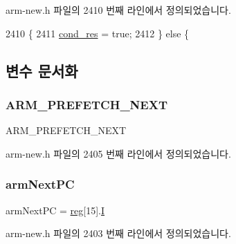 arm-\/new.\+h 파일의 2410 번째 라인에서 정의되었습니다.


\begin{DoxyCode}
2410                    \{
2411     \mbox{\hyperlink{arm-new_8h_ae931ce7d834148867ceeb444446afb40}{cond\_res}} = \textcolor{keyword}{true};
2412   \} \textcolor{keywordflow}{else} \{
\end{DoxyCode}


\subsection{변수 문서화}
\mbox{\label{arm-new_8h_a20dd0c8e065b8d3fe145119c5180f98a}} 
\subsubsection{\texorpdfstring{A\+R\+M\+\_\+\+P\+R\+E\+F\+E\+T\+C\+H\+\_\+\+N\+E\+XT}{ARM\_PREFETCH\_NEXT}}
{\footnotesize\ttfamily A\+R\+M\+\_\+\+P\+R\+E\+F\+E\+T\+C\+H\+\_\+\+N\+E\+XT}



arm-\/new.\+h 파일의 2405 번째 라인에서 정의되었습니다.

\mbox{\label{arm-new_8h_a7e8bf67a6667274a53fc092b97961ca4}} 
\subsubsection{\texorpdfstring{arm\+Next\+PC}{armNextPC}}
{\footnotesize\ttfamily arm\+Next\+PC = \mbox{\hyperlink{_globals_8h_ae29faba89509024ffd1a292badcedf2d}{reg}}\mbox{[}15\mbox{]}.\mbox{\hyperlink{thumb_8h_a782b7c7c9a56a2031f6270eac7f000d6}{I}}}



arm-\/new.\+h 파일의 2403 번째 라인에서 정의되었습니다.

\mbox{\label{arm-new_8h_a134043aac3959cdf5fba654d934360cb}} 
